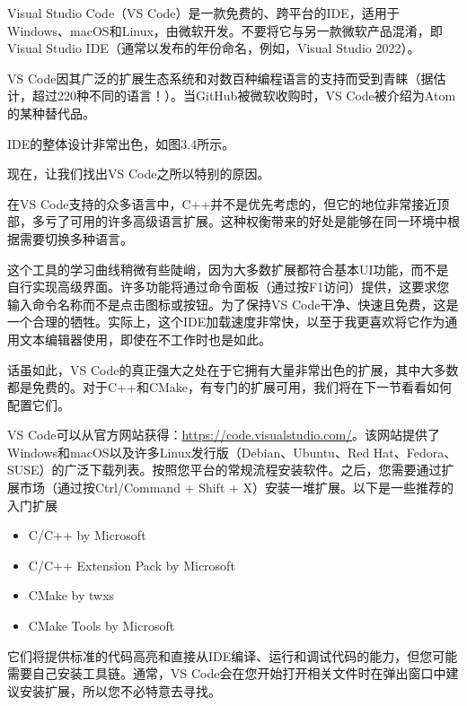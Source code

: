 
Visual Studio Code（VS Code）是一款免费的、跨平台的IDE，适用于Windows、macOS和Linux，由微软开发。不要将它与另一款微软产品混淆，即Visual Studio IDE（通常以发布的年份命名，例如，Visual Studio 2022）。

VS Code因其广泛的扩展生态系统和对数百种编程语言的支持而受到青睐（据估计，超过220种不同的语言！）。当GitHub被微软收购时，VS Code被介绍为Atom的某种替代品。

IDE的整体设计非常出色，如图3.4所示。


现在，让我们找出VS Code之所以特别的原因。


在VS Code支持的众多语言中，C++并不是优先考虑的，但它的地位非常接近顶部，多亏了可用的许多高级语言扩展。这种权衡带来的好处是能够在同一环境中根据需要切换多种语言。

这个工具的学习曲线稍微有些陡峭，因为大多数扩展都符合基本UI功能，而不是自行实现高级界面。许多功能将通过命令面板（通过按F1访问）提供，这要求您输入命令名称而不是点击图标或按钮。为了保持VS Code干净、快速且免费，这是一个合理的牺牲。实际上，这个IDE加载速度非常快，以至于我更喜欢将它作为通用文本编辑器使用，即使在不工作时也是如此。

话虽如此，VS Code的真正强大之处在于它拥有大量非常出色的扩展，其中大多数都是免费的。对于C++和CMake，有专门的扩展可用，我们将在下一节看看如何配置它们。


VS Code可以从官方网站获得：\url{https://code.visualstudio.com/}。该网站提供了Windows和macOS以及许多Linux发行版（Debian、Ubuntu、Red Hat、Fedora、SUSE）的广泛下载列表。按照您平台的常规流程安装软件。之后，您需要通过扩展市场（通过按Ctrl/Command + Shift + X）安装一堆扩展。以下是一些推荐的入门扩展

\begin{itemize}
\item
C/C++ by Microsoft

\item
C/C++ Extension Pack by Microsoft

\item
CMake by twxs

\item
CMake Tools by Microsoft
\end{itemize}

它们将提供标准的代码高亮和直接从IDE编译、运行和调试代码的能力，但您可能需要自己安装工具链。通常，VS Code会在您开始打开相关文件时在弹出窗口中建议安装扩展，所以您不必特意去寻找。

